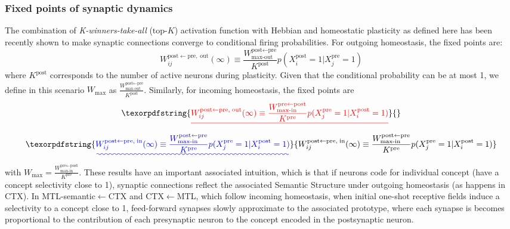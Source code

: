 \documentclass{article}
\providecommand{\DIFaddtex}[1]{{\protect\color{blue}\uwave{#1}}} %
\providecommand{\DIFdeltex}[1]{{\protect\color{red}\sout{#1}}}                      %
\providecommand{\DIFaddbegin}{} %
\providecommand{\DIFaddend}{} %
\providecommand{\DIFdelbegin}{} %
\providecommand{\DIFdelend}{} %
\providecommand{\DIFadd}[1]{\texorpdfstring{\DIFaddtex{#1}}{#1}} %
\providecommand{\DIFdel}[1]{\texorpdfstring{\DIFdeltex{#1}}{}} %
\begin{document}
\subsubsection*{Fixed points of synaptic dynamics}
The combination of \textit{K-winners-take-all} ($\textrm{top-}K$) activation function with Hebbian and homeostatic plasticity as defined here has been recently shown  to make synaptic connections converge to conditional firing probabilities. For outgoing homeostasis, the fixed points are:
  \begin{equation}
     W_{ij}^{\textrm{post}\leftarrow\textrm{pre}, \; \textrm{out}}(\infty) \equiv \frac{W_\textrm{max-out}^{\textrm{post}\leftarrow\textrm{pre}}}{K^\textrm{post}}p(X^\textrm{post}_i = 1| X^\textrm{pre}_j = 1)
 \end{equation}
 where $K^\textrm{post}$ corresponds to the number of active neurons during plasticity. Given that the conditional probability can be at most 1, we define in this scenario $W_\textrm{max}$ as $\frac{W_\textrm{max-out}^{\textrm{post}\leftarrow\textrm{pre}}}{K^\textrm{post}}$. Similarly, for incoming homeostasis, the fixed points are
   \DIFdelbegin \begin{displaymath}
   \DIFdel{W_{ij}^{\textrm{post}\leftarrow\textrm{pre}, \; \textrm{out}}(\infty) \equiv \frac{W_\textrm{max-in}^{\textrm{pre}\leftarrow\textrm{post}}}{K^\textrm{pre}}p(X^\textrm{pre}_j = 1| X^\textrm{post}_i = 1)
 }\end{displaymath}%
\DIFdelend \DIFaddbegin \begin{equation}
   \DIFadd{W_{ij}^{\textrm{post}\leftarrow\textrm{pre}, \; \textrm{in}}(\infty) \equiv \frac{W_\textrm{max-in}^{\textrm{post}\leftarrow\textrm{pre}}}{K^\textrm{pre}}p(X^\textrm{pre}_j = 1| X^\textrm{post}_i = 1)
 }\end{equation}\DIFaddend 
 with \DIFdelbegin \DIFdel{$W_\textrm{max}=\frac{W_\textrm{max-in}^{\textrm{pre}\leftarrow\textrm{post}}}{K^\textrm{pre}}$}\DIFdelend \DIFaddbegin \DIFadd{$W_\textrm{max}=\frac{W_\textrm{max-in}^{\textrm{post}\leftarrow\textrm{pre}}}{K^\textrm{pre}}$}\DIFaddend . These results have an important associated intuition, which is that if neurons code for individual concept (have a concept selectivity close to 1), synaptic connections reflect the associated Semantic Structure  under outgoing homeostasis (as happens in CTX). In MTL-semantic$\leftarrow$CTX and CTX$\leftarrow$MTL, which follow incoming homeostasis, when initial one-shot receptive fields induce a selectivity to a concept close to 1, feed-forward synapses slowly approximate to the associated prototype, where each synapse is becomes proportional to the contribution of each presynaptic neuron to the concept encoded in the postsynaptic neuron.
\end{document}
